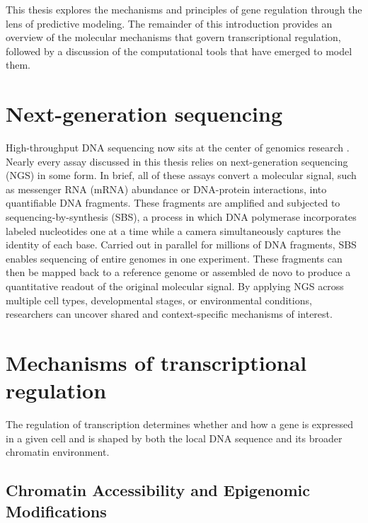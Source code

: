 \begin{dissertationintroduction}
This thesis explores the mechanisms and principles of gene regulation through the lens of predictive modeling. The remainder of this introduction provides an overview of the molecular mechanisms that govern transcriptional regulation, followed by a discussion of the computational tools that have emerged to model them.

\section{Next-generation sequencing}

High-throughput DNA sequencing now sits at the center of genomics research \cite{Rodriguez2023-yt}. Nearly every assay discussed in this thesis relies on next-generation sequencing (NGS) in some form. In brief, all of these assays convert a molecular signal, such as messenger RNA (mRNA) abundance or DNA-protein interactions, into quantifiable DNA fragments. These fragments are amplified and subjected to sequencing-by-synthesis (SBS), a process in which DNA polymerase incorporates labeled nucleotides one at a time while a camera simultaneously captures the identity of each base. Carried out in parallel for millions of DNA fragments, SBS enables sequencing of entire genomes in one experiment. These fragments can then be mapped back to a reference genome or assembled de novo to produce a quantitative readout of the original molecular signal. By applying NGS across multiple cell types, developmental stages, or environmental conditions, researchers can uncover shared and context-specific mechanisms of interest.

\section{Mechanisms of transcriptional regulation}

The regulation of transcription determines whether and how a gene is expressed in a given cell and is shaped by both the local DNA sequence and its broader chromatin environment.

\subsection{Chromatin Accessibility and Epigenomic Modifications}


\end{dissertationintroduction}
